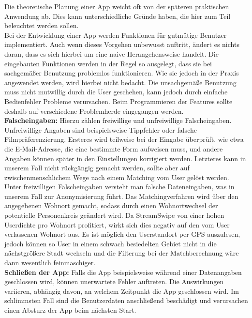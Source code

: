 Die theoretische Planung einer App weicht oft von der späteren praktischen Anwendung ab. Dies kann unterschiedliche Gründe haben, die hier zum Teil beleuchtet werden sollen.\\

\noindent
Bei der Entwicklung einer App werden Funktionen für gutmütige Benutzer implementiert. Auch wenn dieses Vorgehen unbewusst auftritt, ändert es nichts daran, dass es sich hierbei um eine naive Herangehensweise handelt. Die eingebauten Funktionen werden in der Regel so ausgelegt, dass sie bei sachgemäßer Benutzung problemlos funktionieren. Wie sie jedoch  in der Praxis angewendet werden, wird hierbei nicht bedacht. Die unsachgemäße Benutzung muss nicht mutwillig durch die User geschehen, kann jedoch durch einfache Bedienfehler Probleme verursachen. Beim Programmieren der Features sollte deshalb auf verschiedene Problemherde eingegangen werden.\\

\noindent
{}
\textbf{Falscheingaben:} Hierzu zählen freiwillige und unfreiwillige Falscheingaben. Unfreiwillige Angaben sind beispielsweise Tippfehler oder falsche Filmpräferenzierung. Ersteres wird teilweise bei der Eingabe überprüft, wie etwa die E-Mail-Adresse, die eine bestimmte Form aufweisen muss, und andere Angaben können später in den Einstellungen korrigiert werden. Letzteres kann in unserem Fall nicht rückgängig gemacht werden, sollte aber auf zwischenmenschlichem Wege nach einem Matching vom User gelöst werden.\\
Unter freiwilligen Falscheingaben versteht man falsche Dateneingaben, was in unserem Fall zur Anonymisierung führt. Das Matchingverfahren wird über den angegebenen Wohnort gemacht, sodass durch einen Wohnortwechsel der potentielle Personenkreis geändert wird. Da StreamSwipe von einer hohen Userdichte pro Wohnort profitiert, wirkt sich dies negativ auf den vom User verlassenen Wohnort aus. Es ist möglich den Userstandort per GPS auszulesen, jedoch können so User in einem schwach besiedelten Gebiet nicht in die nächstgrößere Stadt wechseln und die Filterung bei der Matchberechnung wäre dann wesentlich feinmaschiger.\\

\noindent
{}
\textbf{Schließen der App:} Falls die App beispielsweise während einer Datenangaben geschlossen wird, können unerwartete Fehler auftreten. Die Auswirkungen  variieren,  abhängig davon, an welchem Zeitpunkt die App geschlossen wird. Im schlimmsten Fall sind die Benutzerdaten anschließend beschädigt und verursachen einen Absturz der App beim nächsten Start.\\

